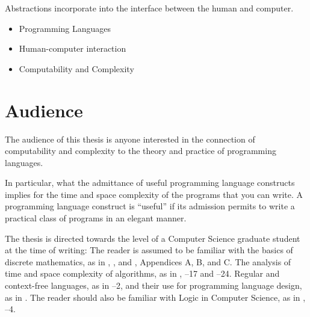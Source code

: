 
Abstractions incorporate into the interface between the human and computer.





\begin{itemize}

\item Programming Languages

\item Human-computer interaction

\item Computability and Complexity

\end{itemize}

\section{Audience} \label{sec:preface:audience}

The audience of this thesis is anyone interested in the connection of
computability and complexity to the theory and practice of programming
languages.

In particular, what the admittance of useful programming language constructs
implies for the time and space complexity of the programs that you can write. A
programming language construct is ``useful'' if its admission permits to write
a practical class of programs in an elegant manner.

\def\ch{\textsection}
\def\chs{\ch\ch}

The thesis is directed towards the level of a Computer Science graduate student
at the time of writing: The reader is assumed to be familiar with the basics of
discrete mathematics, as in \cite{sipser-2013}, \ch0, and
\cite{cormen-et-al-2009}, Appendices A, B, and C. The analysis of time and
space complexity of algorithms, as in \cite{cormen-et-al-2009}, \chs1--17 and
\chs21--24. Regular and context-free languages, as in \cite{sipser-2013}
\chs1--2, and their use for programming language design, as in
\cite{mogensen-2010}. The reader should also be familiar with Logic in Computer
Science, as in \cite{huth-ryan-2004}, \chs1--4.

